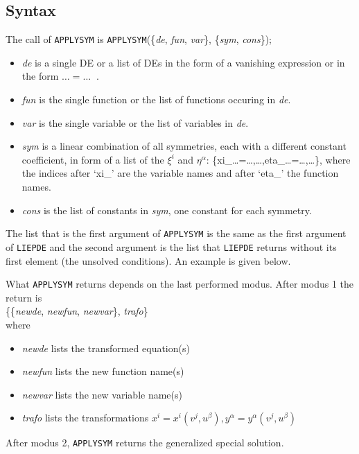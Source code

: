 \subsection{Syntax}
The call of {\tt APPLYSYM} is
{\tt APPLYSYM}(\{{\it de}, {\it fun}, {\it var}\}, \{{\it sym}, {\it cons}\});
\begin{itemize}
\item {\it de} is a single DE or a list of DEs in the form of a vanishing
      expression or in the form $\ldots=\ldots\;\;$.
\item {\it fun} is the single function or the list of functions occuring
      in {\it de}.
\item {\it var} is the single variable or the list of variables in {\it de}.
\item {\it sym} is a linear combination of all symmetries, each with a
      different constant coefficient, in form of a list of the $\xi^i$ and
      $\eta^\alpha$: \{xi\_\ldots=\ldots,\ldots,eta\_\ldots=\ldots,\ldots\},
      where the indices after `xi\_' are the variable names and after `eta\_'
      the function names.
\item {\it cons} is the list of constants in {\it sym}, one constant for each
      symmetry.
\end{itemize}
The list that is the first argument of {\tt APPLYSYM} is the same as the
first argument of {\tt LIEPDE} and the
second argument is the list that {\tt LIEPDE} returns without its first
element (the unsolved conditions). An example is given below.

What {\tt APPLYSYM} returns depends on the last performed modus.
After modus 1 the return is \\
\{\{{\it newde}, {\it newfun}, {\it newvar}\}, {\it trafo}\} \\
where
\begin{itemize}
\item {\it newde} lists the transformed equation(s)
\item {\it newfun} lists the new function name(s)
\item {\it newvar} lists the new variable name(s)
\item {\it trafo} lists the transformations $x^i=x^i(v^j,u^\beta),
      y^\alpha=y^\alpha(v^j,u^\beta)$
\end{itemize}
After modus 2, {\tt APPLYSYM} returns the generalized special solution.
